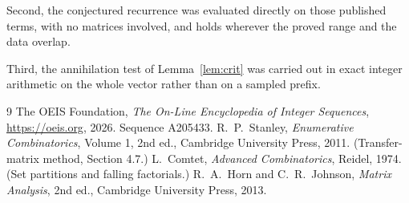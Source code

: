 \documentclass[11pt,a4paper]{article}
\theoremstyle{plain}
\theoremstyle{definition}
\begin{document}
Second, the conjectured recurrence was evaluated directly on those published terms, with no
matrices involved, and holds wherever the proved range and the data overlap.

Third, the annihilation test of Lemma~\ref{lem:crit} was carried out in exact integer
arithmetic on the whole vector rather than on a sampled prefix.

\begin{thebibliography}{9}
 The OEIS Foundation, \emph{The On-Line Encyclopedia of Integer
Sequences}, \url{https://oeis.org}, 2026. Sequence A205433.
 R.~P.~Stanley, \emph{Enumerative Combinatorics}, Volume 1, 2nd ed.,
Cambridge University Press, 2011. (Transfer-matrix method, Section 4.7.)
 L.~Comtet, \emph{Advanced Combinatorics}, Reidel, 1974. (Set partitions
and falling factorials.)
 R.~A.~Horn and C.~R.~Johnson, \emph{Matrix Analysis}, 2nd ed., Cambridge
University Press, 2013.
\end{thebibliography}
\end{document}
